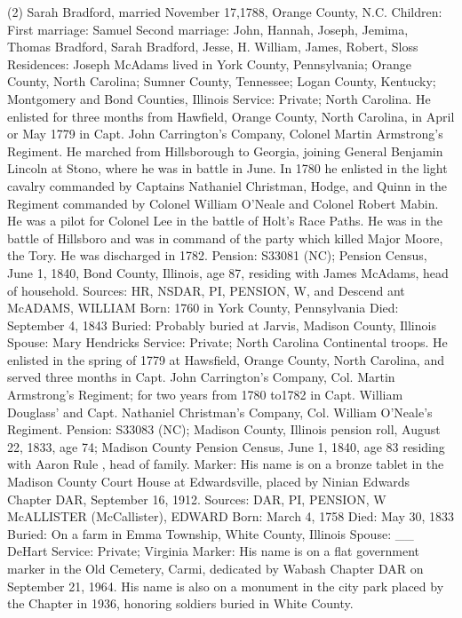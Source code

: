 	 (2) Sarah Bradford, married November 17,1788, Orange County, N.C. 
Children: 	First marriage: Samuel
Second marriage: John, Hannah, Joseph, Jemima, Thomas Bradford, Sarah Bradford, Jesse, H. William,
	James, Robert, Sloss 
Residences: Joseph McAdams lived in York County, Pennsylvania; Orange County, North Carolina; Sumner County, Tennessee; Logan County, Kentucky; Mont­gomery and Bond Counties, Illinois 
Service: Private; North Carolina. He enlisted for three months from Hawfield, Orange County, North Carolina, in April or May 1779 in Capt. John Carring­ton's Company, Colonel Martin Armstrong's Regiment. He marched from Hillsborough to Georgia, joining General Benjamin Lincoln at Stono, where he was in battle in June. In 1780 he enlisted in the light cavalry commanded by Captains Nathaniel Christman, Hodge, and Quinn in the Regiment com­manded by Colonel William O'Neale and Colonel Robert Mabin. He was a pilot for Colonel Lee in the battle of Holt's Race Paths. He was in the battle of Hillsboro and was in command of the party which killed Major Moore, the Tory. He was discharged in 1782. 
Pension: S33081 (NC); Pension Census, June 1, 1840, Bond County, Illinois, age 87, residing with James McAdams, head of household. 
Sources: HR, NSDAR, PI, PENSION, W, and Descend ant 
McADAMS, WILLIAM
Born: 1760 in York County, Pennsylvania
Died: September 4, 1843
Buried: Probably buried at Jarvis, Madison County, Illinois
Spouse: Mary Hendricks
Service: Private; North Carolina Continental troops. He enlisted in the spring of 1779 at Hawsfield, Orange County, North Carolina, and served three months in Capt. John Carrington's Company, Col. Martin Armstrong's Regiment; for two years from 1780 to1782 in Capt. William Douglass' and Capt. Nathaniel Christman's Company, Col. William O'Neale's Regiment. 
Pension: S33083 (NC); Madison County, Illinois pension roll, August 22, 1833, age 74; Madison County Pension Census, June 1, 1840, age 83 residing with Aaron Rule , head of family. 
Marker: His name is on a bronze tablet in the Madison County Court House at Edwardsville, placed by Ninian Edwards Chapter DAR, September 16, 1912. 
Sources: DAR, PI, PENSION, W 
McALLISTER (McCallister), EDWARD
Born: March 4, 1758
Died: May 30, 1833 
Buried: On a farm in Emma Township, White County, Illinois 
Spouse: __ DeHart 
Service: Private; Virginia 
Marker: His name is on a flat government marker in the Old Cemetery, Carmi, dedicated by Wabash Chapter DAR on September 21, 1964. His name is also on a monument in the city park placed by the Chapter in 1936, honoring soldiers buried in White County. 
